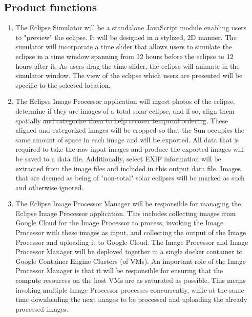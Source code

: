 \documentclass[10pt, onecolumn, draftclsnofoot, letterpaper, compsoc]{IEEEtran}
\begin{document}
\subsection{Product functions}
	\begin{enumerate}
		\item The Eclipse Simulator will be a standalone JavaScript
		module enabling users to "preview" the eclipse. It will be
		designed in a stylized, 2D manner. The simulator will
		incorporate a time slider that allows users to simulate the
		eclipse in a time window spanning from 12 hours before the
		eclipse to 12 hours after it. As users drag the time
		slider, the eclipse will animate in the simulator window.
		The view of the eclipse which users are presented will be
		specific to the selected location.

		\item The Eclipse Image Processor application will ingest
		photos of the eclipse, determine if they are images of a
		total solar eclipse, and if so, align them spatially
		\sout{and categorize them to help recover temporal ordering}.
		These aligned \sout{and categorized}
		images will be cropped so that the Sun
		occupies the same amount of space in each image and will be
		exported. All data that is required to take the raw input
		images and produce the exported images will be saved to a
		data file. Additionally, select EXIF information will be
		extracted from the image files and included in this output
		data file. Images that are deemed as being of "non-total" solar
		eclipses will be marked as such and otherwise ignored.

		\item The Eclipse Image Processor Manager will be responsible for
		managing the Eclipse Image Processor application. This includes
		collecting images from Google Cloud for the Image Processor to process,
		invoking the Image Processor with these images as input, and collecting
		the output of the Image Processor and uploading it to Google Cloud. The
		Image Processor and Image Processor Manager will be deployed together
		in a single docker container to Google Container Engine Clusters (of VMs).
		An important role of the Image Processor Manager is that it will be responsible
		for ensuring that the compute resources on the host VMs are as saturated as
		possible. This means invoking multiple Image Processor processes concurrently,
		while at the same time downloading the next images to be processed and uploading
		the already processed images.


	\end{enumerate}
\end{document}
